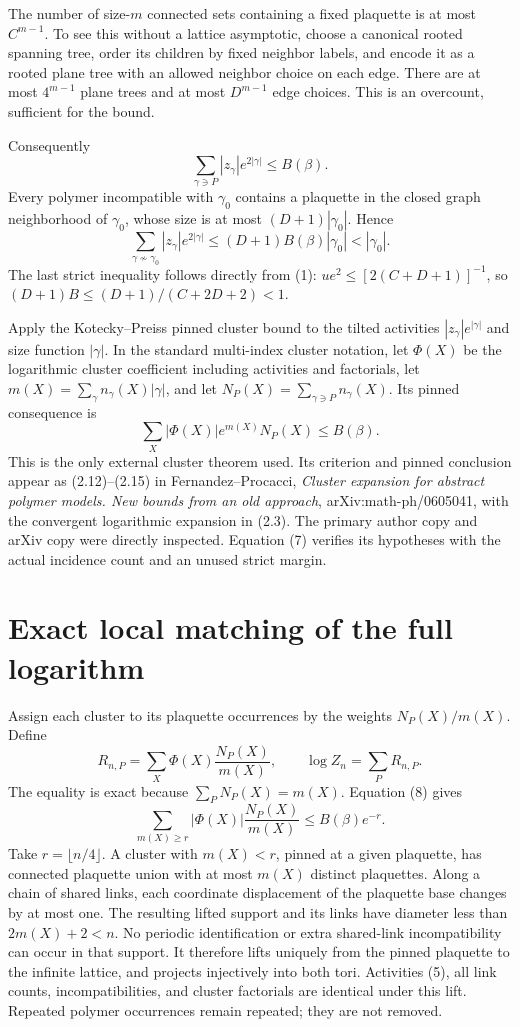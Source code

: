 \documentclass{article}
\begin{document}
The number of size-$m$ connected sets containing a fixed plaquette is at most $C^{m-1}$. To see this without a lattice asymptotic, choose a canonical rooted spanning tree, order its children by fixed neighbor labels, and encode it as a rooted plane tree with an allowed neighbor choice on each edge. There are at most $4^{m-1}$ plane trees and at most $D^{m-1}$ edge choices. This is an overcount, sufficient for the bound.

Consequently
\[
 \sum_{\gamma\ni P}|z_\gamma|e^{2|\gamma|}\leq B(\beta).
 \tag{6}
\]
Every polymer incompatible with $\gamma_0$ contains a plaquette in the closed graph neighborhood of $\gamma_0$, whose size is at most $(D+1)|\gamma_0|$. Hence
\[
 \sum_{\gamma\not\sim\gamma_0}|z_\gamma|e^{2|\gamma|}
 \leq (D+1)B(\beta)|\gamma_0|<|\gamma_0|.
 \tag{7}
\]
The last strict inequality follows directly from (1): $ue^2\leq[2(C+D+1)]^{-1}$, so $(D+1)B\leq(D+1)/(C+2D+2)<1$.

Apply the Kotecky--Preiss pinned cluster bound to the tilted activities $|z_\gamma|e^{|\gamma|}$ and size function $|\gamma|$. In the standard multi-index cluster notation, let $\Phi(X)$ be the logarithmic cluster coefficient including activities and factorials, let
$m(X)=\sum_\gamma n_\gamma(X)|\gamma|$, and let
$N_P(X)=\sum_{\gamma\ni P}n_\gamma(X)$. Its pinned consequence is
\[
 \sum_X |\Phi(X)|e^{m(X)}N_P(X)\leq B(\beta).
 \tag{8}
\]
This is the only external cluster theorem used. Its criterion and pinned conclusion appear as (2.12)--(2.15) in Fernandez--Procacci, \emph{Cluster expansion for abstract polymer models. New bounds from an old approach}, arXiv:math-ph/0605041, with the convergent logarithmic expansion in (2.3). The primary author copy and arXiv copy were directly inspected. Equation (7) verifies its hypotheses with the actual incidence count and an unused strict margin.

\section{Exact local matching of the full logarithm}
Assign each cluster to its plaquette occurrences by the weights $N_P(X)/m(X)$. Define
\[
 R_{n,P}=\sum_X\Phi(X)\frac{N_P(X)}{m(X)},\qquad
 \log Z_n=\sum_PR_{n,P}.
 \tag{9}
\]
The equality is exact because $\sum_PN_P(X)=m(X)$. Equation (8) gives
\[
 \sum_{m(X)\geq r}|\Phi(X)|\frac{N_P(X)}{m(X)}
 \leq B(\beta)e^{-r}.
 \tag{10}
\]
Take $r=\lfloor n/4\rfloor$. A cluster with $m(X)<r$, pinned at a given plaquette, has connected plaquette union with at most $m(X)$ distinct plaquettes. Along a chain of shared links, each coordinate displacement of the plaquette base changes by at most one. The resulting lifted support and its links have diameter less than $2m(X)+2<n$. No periodic identification or extra shared-link incompatibility can occur in that support. It therefore lifts uniquely from the pinned plaquette to the infinite lattice, and projects injectively into both tori. Activities (5), all link counts, incompatibilities, and cluster factorials are identical under this lift. Repeated polymer occurrences remain repeated; they are not removed.
\end{document}

